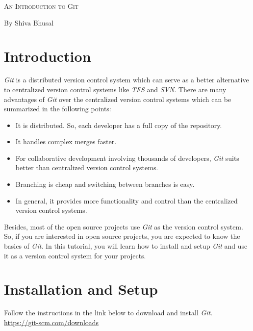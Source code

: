 \documentclass[letterpaper]{article}
\newcommand{\reporttitle}{An Introduction to Git}
\newcommand{\name}{By Shiva Bhusal}
\newcommand{\course}{}
\begin{document}
\begin{center}{\huge \scshape \reporttitle}\end{center}
\begin{center}\vspace{0.2em} {\Large \name\\}
  {\course}\end{center} 
  
\tableofcontents
  
\section{Introduction}
\textit{Git} is a distributed version control system which can serve as a better alternative to centralized version control systems like \textit{TFS} and \textit{SVN}. There are many advantages of \textit{Git} over the centralized version control systems which can be summarized in the following points:
\begin{itemize}
    \item It is distributed. So, each developer has a full copy of the repository.
    \item It handles complex merges faster.
    \item For collaborative development involving thousands of developers, \textit{Git} suits better than centralized version control systems.
    \item Branching is cheap and switching between branches is easy.
    \item In general, it provides more functionality and control than the centralized version control systems.
\end{itemize}

Besides, most of the open source projects use \textit{Git} as the version control system. So, if you are interested in open source projects, you are expected to know the basics of \textit{Git}. In this tutorial, you will learn how to install and setup \textit{Git} and use it as a version control system for your projects. 

\section{Installation and Setup}
    Follow the instructions in the link below to download and install \textit{Git}.\\

\url{https://git-scm.com/downloads}
\\
\end{document}

